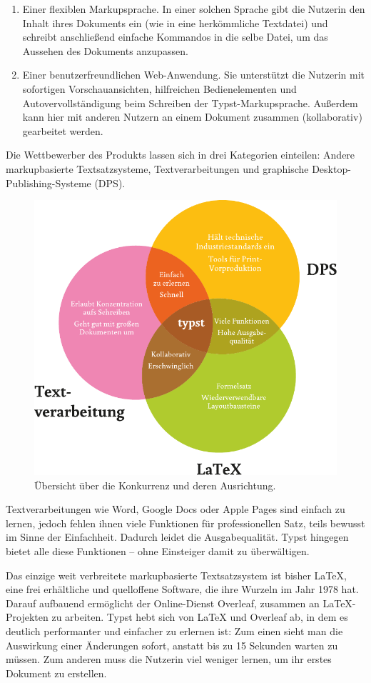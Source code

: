 \documentclass[11pt, a4paper]{article}
\newcommand{\gender}{\raisebox{-.25em}{*}}
\renewcommand{\glossary} {\marginsymbol{$\hookrightarrow$}}
\newcommand{\marginsymbol}[1] {\protect\marginsymbolhelper{#1}}
\newcommand{\marginsymbolhelper}[1] {\tabto*{-1cm}\makebox[0cm]{#1}\tabto*{\TabPrevPos}}
\begin{document}
\begin{enumerate}
    \item Einer flexiblen \glossary Markupsprache. In einer solchen Sprache gibt die\gender{} Nutzer\gender{}in den Inhalt ihres\gender{} Dokuments ein (wie in eine herkömmliche Textdatei) und schreibt anschließend einfache Kommandos in die selbe Datei, um das Aussehen des Dokuments anzupassen.
    \item Einer benutzerfreundlichen Web-Anwendung. Sie unterstützt die\gender{} Nutzer\gender{}in mit sofortigen Vorschauansichten, hilfreichen Bedienelementen und Autovervollständigung beim Schreiben der Typst-Markupsprache. Außerdem kann hier mit anderen Nutzern an einem Dokument zusammen (kollaborativ) gearbeitet werden.
\end{enumerate}

Die Wettbewerber des Produkts lassen sich in drei Kategorien einteilen: Andere markupbasierte Textsatzsysteme, Textverarbeitungen und graphische Desktop-Publishing-Systeme (DPS).

\begin{figure}[h]
    \centering
    \includegraphics[width=.5\textwidth]{../assets/venn.pdf}
    \caption{Übersicht über die Konkurrenz und deren Ausrichtung.}
\end{figure}

Textverarbeitungen wie Word, Google Docs oder Apple Pages sind einfach zu lernen, jedoch fehlen ihnen viele Funktionen für professionellen Satz, teils bewusst im Sinne der Einfachheit. Dadurch leidet die Ausgabequalität. Typst hingegen bietet alle diese Funktionen -- ohne Einsteiger damit zu überwältigen.

Das einzige weit verbreitete markupbasierte Textsatzsystem ist bisher LaTeX, eine frei erhältliche und quelloffene Software, die ihre Wurzeln im Jahr 1978 hat. Darauf aufbauend ermöglicht der Online-Dienst Overleaf, zusammen an LaTeX-Projekten zu arbeiten. Typst hebt sich von LaTeX und Overleaf ab, in dem es deutlich performanter und einfacher zu erlernen ist: Zum einen sieht man die Auswirkung einer Änderungen sofort, anstatt bis zu 15 Sekunden warten zu müssen. Zum anderen muss die\gender{} Nutzer\gender{}in viel weniger lernen, um ihr\gender{} erstes Dokument zu erstellen.
\end{document}
